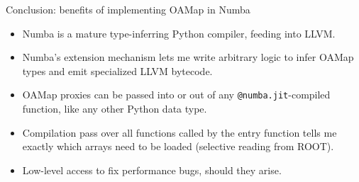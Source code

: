 \documentclass[aspectratio=169]{beamer}
\begin{document}
\begin{frame}{Conclusion: benefits of implementing OAMap in Numba}
\vspace{0.5 cm} \large
\begin{itemize}\setlength{\itemsep}{0.4 cm}
\item Numba is a mature type-inferring Python compiler, feeding into LLVM.

\item Numba's extension mechanism lets me write arbitrary logic to infer OAMap types and emit specialized LLVM bytecode.

\item OAMap proxies can be passed into or out of any {\tt\small @numba.jit}-compiled function, like any other Python data type.

\item Compilation pass over all functions called by the entry function tells me exactly which arrays need to be loaded (selective reading from ROOT).

\item Low-level access to fix performance bugs, should they arise.
\end{itemize}
\end{frame}
\end{document}
